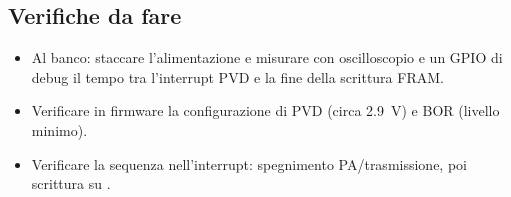 \subsection{Verifiche da fare}
\begin{itemize}
  \item Al banco: staccare l'alimentazione e misurare con oscilloscopio  e un GPIO di debug il tempo tra l'interrupt PVD e la fine della scrittura FRAM.
  \item Verificare in firmware la configurazione di PVD (circa \SI{2,9}{\volt}) e BOR (livello minimo).
  \item Verificare la sequenza nell'interrupt: spegnimento PA/trasmissione, poi scrittura su .
\end{itemize}
